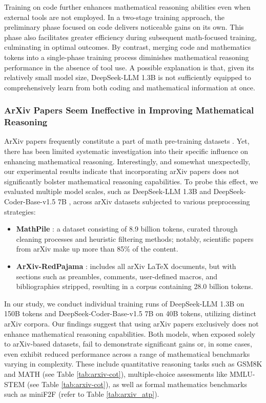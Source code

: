 \begin{itemize}[topsep=0pt]
\begin{itemize}[topsep=0pt]
Training on code further enhances mathematical reasoning abilities even when external tools are not employed. In a two-stage training approach, the preliminary phase focused on code delivers noticeable gains on its own. This phase also facilitates greater efficiency during subsequent math-focused training, culminating in optimal outcomes. By contrast, merging code and mathematics tokens into a single-phase training process diminishes mathematical reasoning performance in the absence of tool use. A possible explanation is that, given its relatively small model size, DeepSeek-LLM 1.3B is not sufficiently equipped to comprehensively learn from both coding and mathematical information at once.

\subsubsection{ArXiv Papers Seem Ineffective in Improving Mathematical Reasoning}

ArXiv papers frequently constitute a part of math pre-training datasets \citep{minerva,gpt-f,llemma,mathpile}. Yet, there has been limited systematic investigation into their specific influence on enhancing mathematical reasoning. Interestingly, and somewhat unexpectedly, our experimental results indicate that incorporating arXiv papers does not significantly bolster mathematical reasoning capabilities. To probe this effect, we evaluated multiple model scales, such as DeepSeek-LLM 1.3B and DeepSeek-Coder-Base-v1.5 7B \citep{deepseek-coder}, across arXiv datasets subjected to various preprocessing strategies:

\begin{itemize}[topsep=0pt]
    \item \textbf{MathPile} \citep{mathpile}: a dataset consisting of 8.9 billion tokens, curated through cleaning processes and heuristic filtering methods; notably, scientific papers from arXiv make up more than 85\% of the content.
    \item \textbf{ArXiv-RedPajama} \citep{redpajama}: includes all arXiv LaTeX documents, but with sections such as preambles, comments, user-defined macros, and bibliographies stripped, resulting in a corpus containing 28.0 billion tokens.
\end{itemize}

In our study, we conduct individual training runs of DeepSeek-LLM 1.3B on 150B tokens and DeepSeek-Coder-Base-v1.5 7B on 40B tokens, utilizing distinct arXiv corpora. Our findings suggest that using arXiv papers exclusively does not enhance mathematical reasoning capabilities. Both models, when exposed solely to arXiv-based datasets, fail to demonstrate significant gains or, in some cases, even exhibit reduced performance across a range of mathematical benchmarks varying in complexity. These include quantitative reasoning tasks such as GSM8K and MATH (see Table \ref{tab:arxiv-cot}), multiple-choice assessments like MMLU-STEM (see Table \ref{tab:arxiv-cot}), as well as formal mathematics benchmarks such as miniF2F (refer to Table \ref{tab:arxiv_atp}).


\end{itemize}
\end{itemize}
